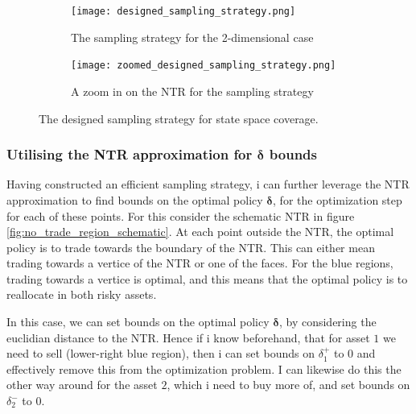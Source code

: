 \documentclass[11pt]{article}
\begin{document}
\begin{figure}[!ht]
  \centering
    \begin{subfigure}[t]{0.48\textwidth}
        \centering
        \texttt{[image: designed\_sampling\_strategy.png]}
        \caption{The sampling strategy for the 2-dimensional case}
        \label{fig: Designed_sampling_strategy}
    \end{subfigure}%
    \hfill
    \begin{subfigure}[t]{0.48\textwidth}
        \centering
        \texttt{[image: zoomed\_designed\_sampling\_strategy.png]}
        \caption{A zoom in on the \ac{NTR} for the sampling strategy}
        \label{fig: Designed_sampling_strategy-zoom}
    \end{subfigure}

\caption{The designed sampling strategy for state space coverage.}
\end{figure}

\subsubsection{Utilising the NTR approximation for $\boldsymbol{\delta}$ bounds} \label{Subsubsection: NTR-deltabounds}
Having constructed an efficient sampling strategy, i can further leverage the \ac{NTR} approximation to find bounds on the optimal policy $\boldsymbol{\delta}$,
for the optimization step for each of these points. For this consider the schematic \ac{NTR} in figure \ref{fig:no_trade_region_schematic}.
At each point outside the NTR, the optimal policy is to trade towards the boundary of the NTR. This can either mean trading towards a vertice of the \ac{NTR} or one of the faces.
For the blue regions, trading towards a vertice is optimal, and this means that the optimal policy is to reallocate in both risky assets.

In this case, we can set bounds on the optimal policy $\boldsymbol{\delta}$, by considering the euclidian distance to the \ac{NTR}.
Hence if i know beforehand, that for asset $1$ we need to sell (lower-right blue region), then i can set bounds on $\delta_{1}^{+}$ to $0$ and effectively remove this from the optimization problem.
I can likewise do this the other way around for the asset $2$, which i need to buy more of, and set bounds on $\delta_{2}^{-}$ to $0$.
\end{document}

